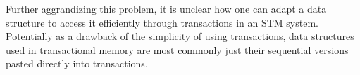 
Further aggrandizing this problem, it is unclear how one can adapt a data structure to 
access it efficiently through transactions in an STM system.
Potentially as a drawback of the simplicity of using transactions, 
data structures used in transactional memory are most commonly just
their sequential versions pasted directly into transactions.


